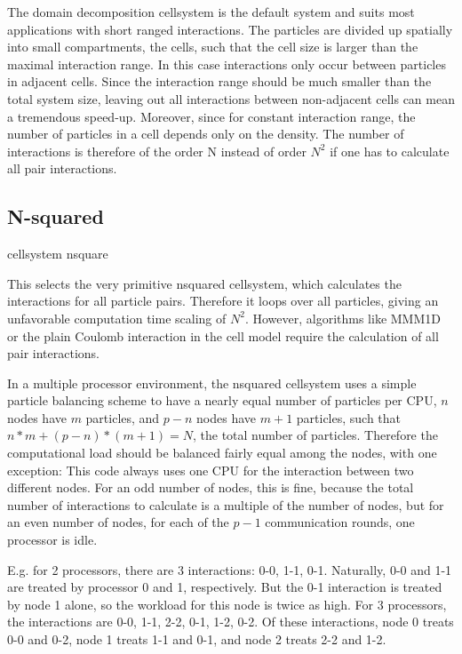 The domain decomposition cellsystem is the default system and suits
most applications with short ranged interactions. The particles are
divided up spatially into small compartments, the cells, such that the
cell size is larger than the maximal interaction range. In this case
interactions only occur between particles in adjacent cells. Since the
interaction range should be much smaller than the total system size,
leaving out all interactions between non-adjacent cells can mean a
tremendous speed-up. Moreover, since for constant interaction range,
the number of particles in a cell depends only on the density. The
number of interactions is therefore of the order N instead of order
$N^2$ if one has to calculate all pair interactions.

\subsection{N-squared}

\begin{pysyntax}
\end{pysyntax}


\begin{essyntax}
  cellsystem nsquare 
\end{essyntax}
This selects the very primitive nsquared cellsystem, which calculates
the interactions for all particle pairs. Therefore it loops over all
particles, giving an unfavorable computation time scaling of $N^2$.
However, algorithms like MMM1D or the plain Coulomb interaction in the
cell model require the calculation of all pair interactions.

In a multiple processor environment, the nsquared cellsystem uses a
simple particle balancing scheme to have a nearly equal number of
particles per CPU, \ie $n$ nodes have $m$ particles, and $p-n$ nodes
have $m+1$ particles, such that $n*m+(p-n)*(m+1)=N$, the total number
of particles. Therefore the computational load should be balanced
fairly equal among the nodes, with one exception: This code always
uses one CPU for the interaction between two different nodes. For an
odd number of nodes, this is fine, because the total number of
interactions to calculate is a multiple of the number of nodes, but
for an even number of nodes, for each of the $p-1$ communication
rounds, one processor is idle.

E.g. for 2 processors, there are 3 interactions: 0-0, 1-1, 0-1.
Naturally, 0-0 and 1-1 are treated by processor 0 and 1, respectively.
But the 0-1 interaction is treated by node 1 alone, so the workload
for this node is twice as high. For 3 processors, the interactions are
0-0, 1-1, 2-2, 0-1, 1-2, 0-2. Of these interactions, node 0 treats 0-0
and 0-2, node 1 treats 1-1 and 0-1, and node 2 treats 2-2 and 1-2.

